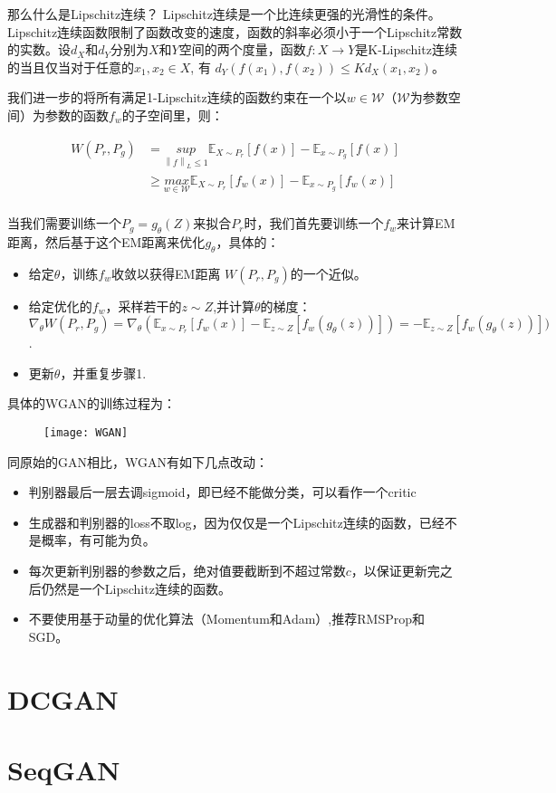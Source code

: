 那么什么是Lipschitz连续？ Lipschitz连续是一个比连续更强的光滑性的条件。Lipschitz连续函数限制了函数改变的速度，函数的斜率必须小于一个Lipschitz常数的实数。设$d_X$和$d_Y$分别为$X$和$Y$空间的两个度量，函数$f:X \to Y$是K-Lipschitz连续的当且仅当对于任意的$x_1, x_2 \in X$, 有 $d_Y(f(x_1), f(x_2)) \leq K d_X(x_1, x_2)$。

我们进一步的将所有满足1-Lipschitz连续的函数约束在一个以$w \in \mathcal{W}$（$\mathcal{W}$为参数空间）为参数的函数$f_w$的子空间里，则：

\begin{displaymath}
\begin{split}
W({P}_r, {P}_g) & = \underset{\left \| f \right \|_{L} \leq 1}{sup} \mathbb{E} _{X \sim {P}_r}[f(x)] - \mathbb{E}_{x \sim {P}_g}[f(x)]\\
& \ge \underset{w \in \mathcal{W}}{max} \mathbb{E} _{X \sim {P}_r}[f_w(x)] - \mathbb{E}_{x \sim {P}_g}[f_w(x)]\\
\end{split}
\end{displaymath}

当我们需要训练一个$P_g = g_\theta(Z)$来拟合$P_r$时，我们首先要训练一个$f_w$来计算EM距离，然后基于这个EM距离来优化$g_\theta$，具体的：
\begin{itemize}
\item 给定$\theta$，训练$f_w$收敛以获得EM距离 $W(P_r, P_g)$的一个近似。
\item 给定优化的$f_w$，采样若干的$z \sim Z$,并计算$\theta$的梯度：$\nabla_\theta W(P_r, P_g) = \nabla_\theta(\mathbb{E}_{x \sim P_r}[f_w(x)] - \mathbb{E}_{z \sim Z}[f_w(g_\theta(z))]) = -\mathbb{E}_{z \sim Z}[f_w(g_\theta(z))]) $.
\item 更新$\theta$，并重复步骤1.
\end{itemize} 

具体的WGAN的训练过程为：

 \begin{figure}[htbp]
 \centering
 \texttt{[image: WGAN]}
 \end{figure}

同原始的GAN相比，WGAN有如下几点改动：
\begin{itemize}
\item 判别器最后一层去调sigmoid，即已经不能做分类，可以看作一个critic
\item 生成器和判别器的loss不取log，因为仅仅是一个Lipschitz连续的函数，已经不是概率，有可能为负。
\item 每次更新判别器的参数之后，绝对值要截断到不超过常数$c$，以保证更新完之后仍然是一个Lipschitz连续的函数。
\item 不要使用基于动量的优化算法（Momentum和Adam）,推荐RMSProp和SGD。 
\end{itemize} 


\section{DCGAN}

\section{SeqGAN}